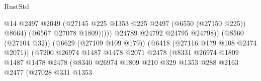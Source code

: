 \begin{lexlean}{RustStd}
\begin{coremodule}
                                                            @14
                                                            @2497
                                                            @2049
                                                            (@27145
                                                              @225
                                                              @1353
                                                              @225
                                                              @2497
                                                              (@6550 (@27150 @225))
                                                              @8664)
                                                            (@6567 @27078 @1809)))))
                                                    @24789
                                                    @24792
                                                    @24795
                                                    @24798))
                                                (@8560 (@27104 @32))
                                                (@6629 (@27109 @109 @179))
                                                (@6418 (@27116 @179 @108 @2474 @2071))
                                                (@7200
                                                  @26974
                                                  @1487
                                                  @1478
                                                  @2071
                                                  @2478
                                                  (@8331
                                                    @26974
                                                    @1809
                                                    @1487
                                                    @1478
                                                    @2478
                                                    (@8340
                                                      @26974
                                                      @1809
                                                      @210
                                                      @329
                                                      @1353
                                                      @288
                                                      @2163
                                                      @2477
                                                      (@27028
                                                        @331
                                                        @1353

\end{coremodule}
\end{lexlean}
